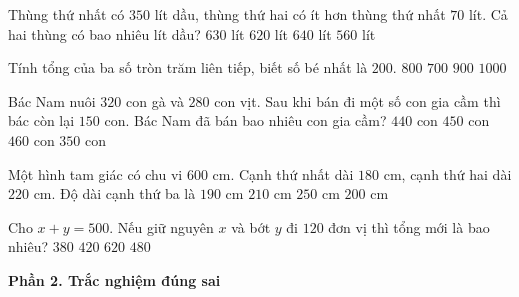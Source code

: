 \begin{ex} %
Thùng thứ nhất có $350$ lít dầu, thùng thứ hai có ít hơn thùng thứ nhất $70$ lít. Cả hai thùng có bao nhiêu lít dầu?
\choice
{\True $630$ lít}
{$620$ lít}
{$640$ lít}
{$560$ lít}
\end{ex}

\begin{ex} %
Tính tổng của ba số tròn trăm liên tiếp, biết số bé nhất là $200$.
\choice
{$800$}
{$700$}
{\True $900$}
{$1 000$}
\end{ex}

\begin{ex} %
Bác Nam nuôi $320$ con gà và $280$ con vịt. Sau khi bán đi một số con gia cầm thì bác còn lại $150$ con. Bác Nam đã bán bao nhiêu con gia cầm?
\choice
{$440$ con}
{\True $450$ con}
{$460$ con}
{$350$ con}
\end{ex}

\begin{ex} %
Một hình tam giác có chu vi $600\text{ cm}$. Cạnh thứ nhất dài $180\text{ cm}$, cạnh thứ hai dài $220\text{ cm}$. Độ dài cạnh thứ ba là
\choice
{$190\text{ cm}$}
{$210\text{ cm}$}
{$250\text{ cm}$}
{\True $200\text{ cm}$}
\end{ex}

\begin{ex} %
Cho $x + y = 500$. Nếu giữ nguyên $x$ và bớt $y$ đi $120$ đơn vị thì tổng mới là bao nhiêu?
\choice
{\True $380$}
{$420$}
{$620$}
{$480$}
\end{ex}

\textbf{Phần 2. Trắc nghiệm đúng sai}

